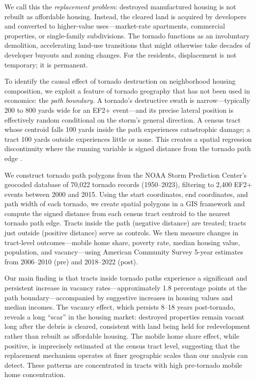 \documentclass[12pt]{article}
\begin{document}
We call this the \textit{replacement problem}: destroyed manufactured housing is not rebuilt as affordable housing. Instead, the cleared land is acquired by developers and converted to higher-value uses---market-rate apartments, commercial properties, or single-family subdivisions. The tornado functions as an involuntary demolition, accelerating land-use transitions that might otherwise take decades of developer buyouts and zoning changes. For the residents, displacement is not temporary; it is permanent.

To identify the causal effect of tornado destruction on neighborhood housing composition, we exploit a feature of tornado geography that has not been used in economics: the \textit{path boundary}. A tornado's destructive swath is narrow---typically 200 to 800 yards wide for an EF2+ event---and its precise lateral position is effectively random conditional on the storm's general direction. A census tract whose centroid falls 100 yards inside the path experiences catastrophic damage; a tract 100 yards outside experiences little or none. This creates a spatial regression discontinuity where the running variable is signed distance from the tornado path edge \citep{cattaneo2020practical}.

We construct tornado path polygons from the NOAA Storm Prediction Center's geocoded database of 70,022 tornado records (1950--2023), filtering to 2,400 EF2+ events between 2000 and 2015. Using the start coordinates, end coordinates, and path width of each tornado, we create spatial polygons in a GIS framework and compute the signed distance from each census tract centroid to the nearest tornado path edge. Tracts inside the path (negative distance) are treated; tracts just outside (positive distance) serve as controls. We then measure changes in tract-level outcomes---mobile home share, poverty rate, median housing value, population, and vacancy---using American Community Survey 5-year estimates from 2006--2010 (pre) and 2018--2022 (post).

Our main finding is that tracts inside tornado paths experience a significant and persistent increase in vacancy rates---approximately 1.8 percentage points at the path boundary---accompanied by suggestive increases in housing values and median incomes. The vacancy effect, which persists 8--18 years post-tornado, reveals a long ``scar'' in the housing market: destroyed properties remain vacant long after the debris is cleared, consistent with land being held for redevelopment rather than rebuilt as affordable housing. The mobile home share effect, while positive, is imprecisely estimated at the census tract level, suggesting that the replacement mechanism operates at finer geographic scales than our analysis can detect. These patterns are concentrated in tracts with high pre-tornado mobile home concentration.
\end{document}
